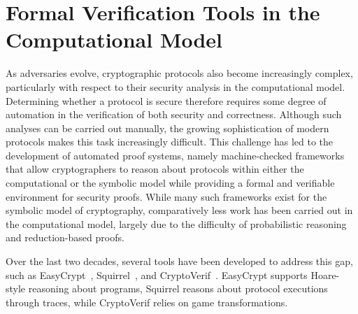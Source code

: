 \chapter{Formal Verification Tools in the Computational Model}\label{chapter:formal-tools}
\lhead[\fancyplain{}{\bfseries\thepage}]{\fancyplain{}{\bfseries\rightmark}}
As adversaries evolve, cryptographic protocols also become increasingly complex, particularly with respect to their security analysis in the computational model. Determining whether a protocol is secure therefore requires some degree of automation in the verification of both security and correctness. Although such analyses can be carried out manually, the growing sophistication of modern protocols makes this task increasingly difficult. This challenge has led to the development of automated proof systems, namely machine-checked frameworks that allow cryptographers to reason about protocols within either the computational or the symbolic model while providing a formal and verifiable environment for security proofs. While many such frameworks exist for the symbolic model of cryptography, comparatively less work has been carried out in the computational model, largely due to the difficulty of probabilistic reasoning and reduction-based proofs.

Over the last two decades, several tools have been developed to address this gap, such as EasyCrypt~\cite{easy-crypy-a-tutorial}, Squirrel~\cite{the-squirrel-prover-and-its-logic}, and CryptoVerif~\cite{a-computationally-sound-automatic-prover-for-cryptographic-protocols}. EasyCrypt supports Hoare-style reasoning about programs, Squirrel reasons about protocol executions through traces, while CryptoVerif relies on game transformations.

